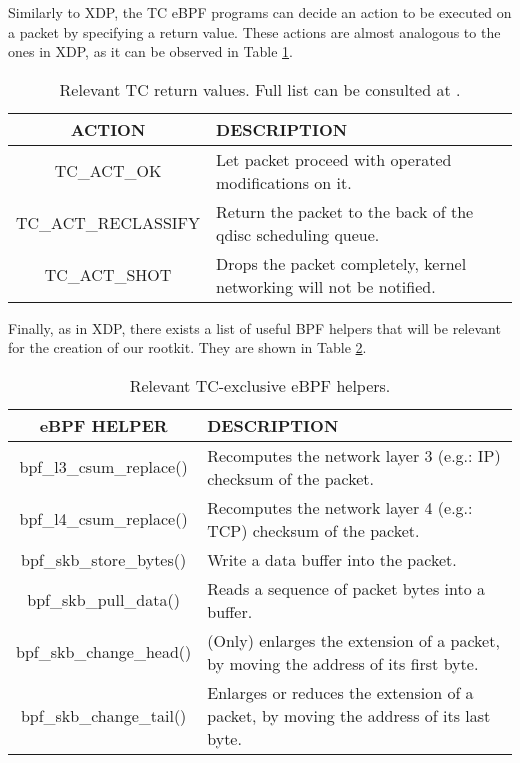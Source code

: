 Similarly to XDP, the TC eBPF programs can decide an action to be executed on a packet by specifying a return value. These actions are almost analogous to the ones in XDP, as it can be observed in Table \ref{table:tc_actions}.

\begin{table}[htbp]
\begin{tabular}{|c|>{\centering\arraybackslash}p{9cm}|}
\hline
\textbf{ACTION} & \textbf{DESCRIPTION}\\
\hline
\hline
TC\_ACT\_OK & Let packet proceed with operated modifications on it.\\
\hline
TC\_ACT\_RECLASSIFY & Return the packet to the back of the qdisc scheduling queue.\\
\hline
TC\_ACT\_SHOT & Drops the packet completely, kernel networking will not be notified.\\
\hline
\end{tabular}
\caption{Relevant TC return values. Full list can be consulted at \cite{tc_ret_list_complete}.}
\label{table:tc_actions}
\end{table}

Finally, as in XDP, there exists a list of useful BPF helpers that will be relevant for the creation of our rootkit. They are shown in Table \ref{table:tc_helpers}.
\begin{table}[htbp]
\begin{tabular}{|c|>{\centering\arraybackslash}p{9cm}|}
\hline
\textbf{eBPF HELPER} & \textbf{DESCRIPTION}\\
\hline
\hline
bpf\_l3\_csum\_replace() & Recomputes the network layer 3 (e.g.: IP) checksum of the packet.\\
\hline
bpf\_l4\_csum\_replace() & Recomputes the network layer 4 (e.g.: TCP) checksum of the packet.\\
\hline
bpf\_skb\_store\_bytes() & Write a data buffer into the packet.\\
\hline
bpf\_skb\_pull\_data() & Reads a sequence of packet bytes into a buffer.\\
\hline
bpf\_skb\_change\_head() & (Only) enlarges the extension of a packet, by moving the address of its first byte.\\
\hline
bpf\_skb\_change\_tail() & Enlarges or reduces the extension of a packet, by moving the address of its last byte.\\
\hline
\hline
\end{tabular}
\caption{Relevant TC-exclusive eBPF helpers.}
\label{table:tc_helpers}
\end{table}


